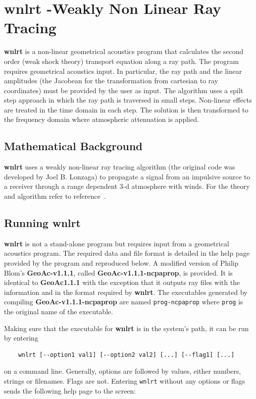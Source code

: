 
\section{wnlrt -Weakly Non Linear Ray Tracing}
\label{sec: wnlrt}

{\bf wnlrt} is a non-linear geometrical acoustics program that calculates the second order (weak shock theory) transport equation along a ray path. The program requires geometrical acoustics input. In particular, the ray path and the linear amplitudes (the Jacobean for the transformation from cartesian to ray coordinates) must be provided by the user as input. The algorithm uses a spilt step approach in which the ray path is traversed in small steps. Non-linear effects are treated in the time domain in each step. The solution is then transformed to the frequency domain where atmospheric attenuation is applied. 

\subsection{Mathematical Background}
\label{sec: wnlrt math}

{\bf {wnlrt}} uses a weakly non-linear ray tracing algorithm (the original code was developed by Joel B. Lonzaga) to propagate a signal from an impulsive source to a receiver through a range dependent 3-d atmosphere with winds. For the theory and algorithm refer to
reference~\cite{non-lin_therm}. 

\subsection{Running wnlrt}
\label{sec: running wnlrt}

{\bf wnlrt} is not a stand-alone program but requires input from a geometrical acoustics program. The required data and file format is detailed in the help page provided by the program and reproduced below. A modified version of Philip Blom's {\bf GeoAc-v1.1.1}, called {\bf GeoAc-v1.1.1-ncpaprop}, is provided. It is identical to {\bf GeoAc1.1.1} with the exception that it outputs ray files with the information and in the format required by {\bf wnlrt}. The executables generated by compiling {\bf GeoAc-v1.1.1-ncpaprop} are named \verb+prog-ncpaprop+ where \verb+prog+ is the original name of the executable. 

Making sure that the executable for {\bf wnlrt} is in the system's path, it can be run by entering 
\begin{verbatim} 
    wnlrt [--option1 val1] [--option2 val2] [...] [--flag1] [...] 
\end{verbatim}
on a command line. Generally, options are followed by values, either numbers, strings or filenames. Flags are not. Entering \verb"wnlrt" without any options or flags sends the following help page to the screen: 

